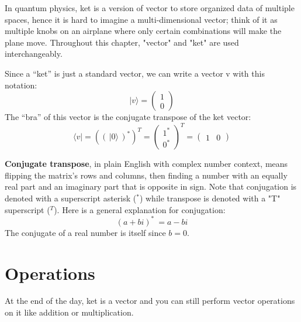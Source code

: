 In quantum physics, ket is a version of vector to store organized data of multiple spaces, hence it is hard to imagine a multi-dimensional vector; think of it as multiple knobs on an airplane where only certain combinations will make the plane move. Throughout this chapter, "vector" and "ket" are used interchangeably.

Since a “ket” is just a standard vector, we can write a vector v with this notation: 
\[
    |v \rangle
    = \begin{pmatrix} 1 \\ 0 \end{pmatrix}
\]
The “bra” of this vector is the conjugate transpose of the ket vector:
\begin{equation}
    \langle v|
    = ((\,|0\rangle\,)^*)^T
    = \begin{pmatrix}
        1^* \\
        0^*
    \end{pmatrix}^T
    = \begin{pmatrix} 1 & 0 \end{pmatrix}
\end{equation}

\textbf{Conjugate transpose}, in plain English with complex number context, means flipping the matrix's rows and columns, then finding a number with an equally real part and an imaginary part that is opposite in sign. Note that conjugation is denoted with a superscript asterisk ($^*$) while transpose is denoted with a "T" superscript ($^T$). Here is a general explanation for conjugation:
\begin{equation} (a+bi)^*\ = a-bi \end{equation}
The conjugate of a real number is itself since $b = 0$.

\section{Operations}
At the end of the day, ket is a vector and you can still perform vector operations on it like addition or multiplication.

